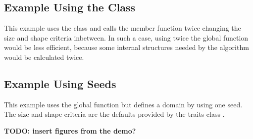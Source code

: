 
\subsection{Example Using the Class }

This example uses the class  and calls
  the  member function twice changing the size and
  shape criteria inbetween. In such a case, using twice the global
  function  would be less efficient,
  because some internal structures needed by the algorithm would be
  calculated twice.


\subsection{Example Using Seeds}

This example uses the global function  but
defines a domain by using one seed. The size and shape criteria are the
defaults provided by the traits class .


\textbf{TODO: insert figures from the demo?}

